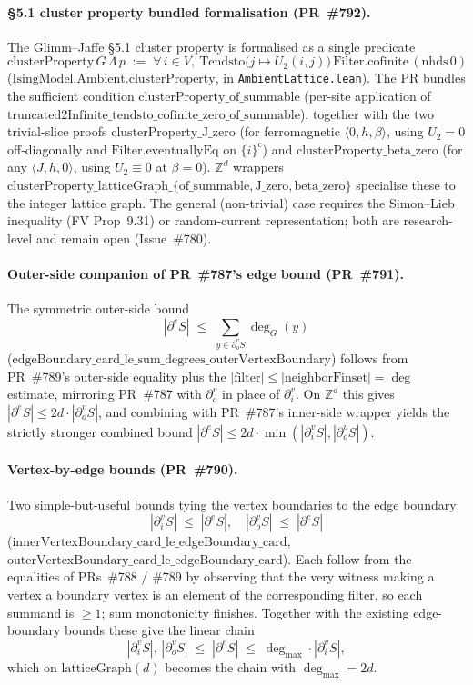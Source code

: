 \documentclass[a4paper,11pt]{article}
\begin{document}
\paragraph{\S5.1 cluster property bundled formalisation (PR~\#792).}
The Glimm--Jaffe \S5.1 cluster property is formalised as a single
predicate
\[
  \mathrm{clusterProperty}\,G\,\Lambda\,p \;:=\;
    \forall\, i \in V,\
    \mathrm{Tendsto}\bigl(j \mapsto U_2(i, j)\bigr)\,
    \mathrm{Filter.cofinite}\,(\mathrm{nhds}\,0)
\]
($\mathrm{IsingModel.Ambient.clusterProperty}$, in
\texttt{AmbientLattice.lean}). The PR bundles the
sufficient condition $\mathrm{clusterProperty\_of\_summable}$
(per-site application of
$\mathrm{truncated2Infinite\_tendsto\_cofinite\_zero\_of\_summable}$),
together with the two trivial-slice proofs
$\mathrm{clusterProperty\_J\_zero}$ (for ferromagnetic
$\langle 0, h, \beta \rangle$, using $U_2 = 0$ off-diagonally and
$\mathrm{Filter.eventuallyEq}$ on $\{i\}^{\mathrm c}$) and
$\mathrm{clusterProperty\_beta\_zero}$ (for any
$\langle J, h, 0 \rangle$, using $U_2 \equiv 0$ at $\beta = 0$).
$\mathbb Z^d$ wrappers
$\mathrm{clusterProperty\_latticeGraph\_\{of\_summable, J\_zero, beta\_zero\}}$
specialise these to the integer lattice graph. The general
(non-trivial) case requires the Simon--Lieb inequality (FV Prop~9.31)
or random-current representation; both are research-level and
remain open (Issue~\#780).

\paragraph{Outer-side companion of PR~\#787's edge bound (PR~\#791).}
The symmetric outer-side bound
\[
  |\partial^e S| \;\le\; \sum_{y \in \partial^v_o S} \deg_G(y)
\]
($\mathrm{edgeBoundary\_card\_le\_sum\_degrees\_outerVertexBoundary}$)
follows from PR~\#789's outer-side equality plus the
$|\mathrm{filter}| \le |\mathrm{neighborFinset}| = \deg$
estimate, mirroring PR~\#787 with $\partial^v_o$ in place of
$\partial^v_i$. On $\mathbb Z^d$ this gives
$|\partial^e S| \le 2 d \cdot |\partial^v_o S|$, and combining
with PR~\#787's inner-side wrapper yields the strictly stronger
combined bound
$|\partial^e S| \le 2 d \cdot \min(|\partial^v_i S|, |\partial^v_o S|)$.

\paragraph{Vertex-by-edge bounds (PR~\#790).}
Two simple-but-useful bounds tying the vertex boundaries to the
edge boundary:
\[
  |\partial^v_i S| \;\le\; |\partial^e S|, \quad
  |\partial^v_o S| \;\le\; |\partial^e S|
\]
($\mathrm{innerVertexBoundary\_card\_le\_edgeBoundary\_card}$,
$\mathrm{outerVertexBoundary\_card\_le\_edgeBoundary\_card}$).
Each follow from the equalities of PRs~\#788 / \#789 by observing
that the very witness making a vertex a boundary vertex is an
element of the corresponding filter, so each summand is $\ge 1$;
sum monotonicity finishes. Together with the existing
edge-boundary bounds these give the linear chain
\[
  |\partial^v_i S|,\, |\partial^v_o S|
  \;\le\; |\partial^e S|
  \;\le\; \deg_{\max} \cdot |\partial^v_i S|,
\]
which on $\mathrm{latticeGraph}(d)$ becomes the chain with
$\deg_{\max} = 2d$.
\end{document}
